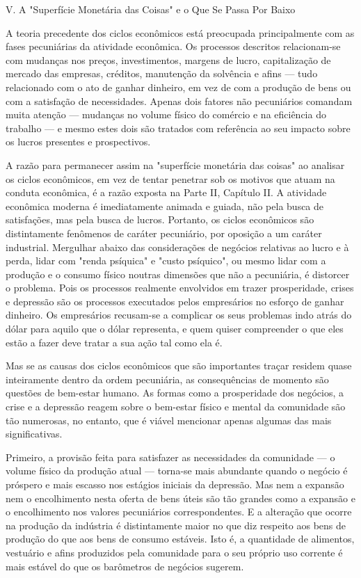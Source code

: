 \documentclass[12pt]{article}
\begin{document}
V. A "Superfície Monetária das Coisas" e o Que Se Passa Por Baixo

A teoria precedente dos ciclos econômicos está preocupada principalmente com as fases pecuniárias da atividade econômica. Os processos descritos relacionam-se com mudanças nos preços, investimentos, margens de lucro, capitalização de mercado das empresas, créditos, manutenção da solvência e afins — tudo relacionado com o ato de ganhar dinheiro, em vez de com a produção de bens ou com a satisfação de necessidades. Apenas dois fatores não pecuniários comandam muita atenção — mudanças no volume físico do comércio e na eficiência do trabalho — e mesmo estes dois são tratados com referência ao seu impacto sobre os lucros presentes e prospectivos.

A razão para permanecer assim na "superfície monetária das coisas" ao analisar os ciclos econômicos, em vez de tentar penetrar sob os motivos que atuam na conduta econômica, é a razão exposta na Parte II, Capítulo II. A atividade econômica moderna é imediatamente animada e guiada, não pela busca de satisfações, mas pela busca de lucros. Portanto, os ciclos econômicos são distintamente fenômenos de caráter pecuniário, por oposição a um caráter industrial. Mergulhar abaixo das considerações de negócios relativas ao lucro e à perda, lidar com "renda psíquica" e "custo psíquico", ou mesmo lidar com a produção e o consumo físico noutras dimensões que não a pecuniária, é distorcer o problema. Pois os processos realmente envolvidos em trazer prosperidade, crises e depressão são os processos executados pelos empresários no esforço de ganhar dinheiro. Os empresários recusam-se a complicar os seus problemas indo atrás do dólar para aquilo que o dólar representa, e quem quiser compreender o que eles estão a fazer deve tratar a sua ação tal como ela é.

Mas se as causas dos ciclos econômicos que são importantes traçar residem quase inteiramente dentro da ordem pecuniária, as consequências de momento são questões de bem-estar humano. As formas como a prosperidade dos negócios, a crise e a depressão reagem sobre o bem-estar físico e mental da comunidade são tão numerosas, no entanto, que é viável mencionar apenas algumas das mais significativas.

Primeiro, a provisão feita para satisfazer as necessidades da comunidade — o volume físico da produção atual — torna-se mais abundante quando o negócio é próspero e mais escasso nos estágios iniciais da depressão. Mas nem a expansão nem o encolhimento nesta oferta de bens úteis são tão grandes como a expansão e o encolhimento nos valores pecuniários correspondentes. E a alteração que ocorre na produção da indústria é distintamente maior no que diz respeito aos bens de produção do que aos bens de consumo estáveis. Isto é, a quantidade de alimentos, vestuário e afins produzidos pela comunidade para o seu próprio uso corrente é mais estável do que os barômetros de negócios sugerem.
\end{document}

